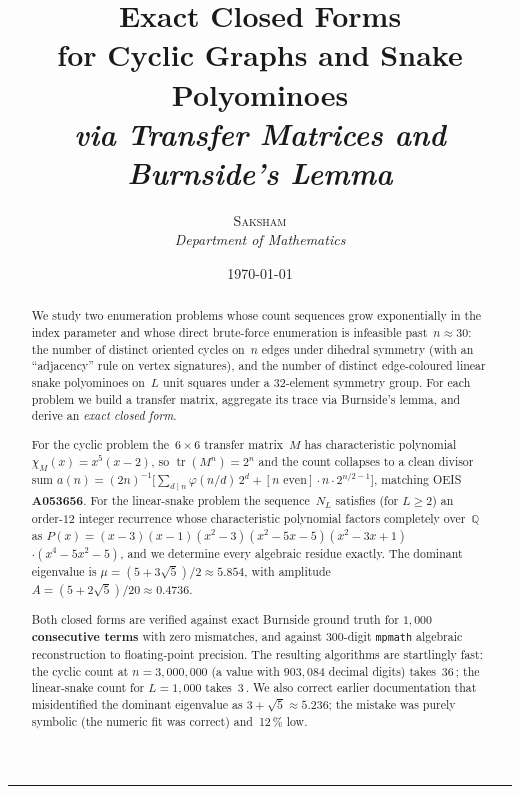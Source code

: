 \documentclass[11pt,a4paper]{article}
\title{
  \color{navy}\Huge\bfseries
  Exact Closed Forms\\
  for Cyclic Graphs and Snake Polyominoes\\[0.2em]
  \Large\normalfont\itshape via Transfer Matrices and Burnside's Lemma
}
\author{
  \textsc{Saksham}\\
  \small\itshape
  Department of Mathematics
}
\date{\today}
\newcommand{\SI}[2]{#1\,#2}
\newcommand{\milli}[0]{\text{m}}
\newcommand{\second}[0]{\text{s}}
\newcommand{\percent}[0]{\%}
\theoremstyle{definition}
\theoremstyle{plain}
\DeclareMathOperator{\tr}{tr}
\newcommand{\Q}{\mathbb{Q}}
\begin{document}
\maketitle
\thispagestyle{empty}

\begin{abstract}
We study two enumeration problems whose count sequences grow exponentially
in the index parameter and whose direct brute-force enumeration is
infeasible past~$n\!\approx\!30$: the number of distinct oriented cycles
on~$n$ edges under dihedral symmetry (with an ``adjacency'' rule on vertex
signatures), and the number of distinct edge-coloured linear snake
polyominoes on~$L$ unit squares under a $32$-element symmetry group.
For each problem we build a transfer matrix, aggregate its trace via
Burnside's lemma, and derive an \emph{exact closed form}.

For the cyclic problem the~$6\times 6$ transfer matrix~$M$ has
characteristic polynomial~$\chi_M(x) = x^5(x-2)$, so $\tr(M^n) = 2^n$ and
the count collapses to a clean divisor sum
$a(n) = (2n)^{-1}\bigl[\sum_{d\mid n}\varphi(n/d)\,2^d + [n \text{ even}]\cdot
n\cdot 2^{n/2-1}\bigr]$, matching OEIS \textbf{A053656}.
For the linear-snake problem the sequence~$N_L$ satisfies (for $L\ge 2$)
an order-$12$ integer recurrence whose characteristic polynomial factors
completely over~$\Q$ as $P(x) = (x-3)(x-1)(x^2-3)(x^2-5x-5)(x^2-3x+1)$ $\cdot(x^4-5x^2-5)$,
and we determine every algebraic residue exactly.  The dominant eigenvalue is
$\mu = (5+3\sqrt{5})/2 \approx 5.854$, with amplitude
$A = (5+2\sqrt{5})/20 \approx 0.4736$.

Both closed forms are verified against exact Burnside ground truth for
\textbf{$1{,}000$ consecutive terms} with zero mismatches, and against
$300$-digit \texttt{mpmath} algebraic reconstruction to floating-point
precision.  The resulting algorithms are startlingly fast: the cyclic
count at $n = 3{,}000{,}000$ (a value with $903{,}084$ decimal digits)
takes~\SI{36}{\milli\second}; the linear-snake count for $L=1{,}000$
takes~\SI{3}{\milli\second}.  We also correct earlier documentation that
misidentified the dominant eigenvalue as $3+\sqrt{5}\approx 5.236$; the
mistake was purely symbolic (the numeric fit was correct) and~\SI{12}{\percent}
low.

\end{abstract}

\begin{center}
\rule{0.5\linewidth}{0.4pt}
\end{center}
\end{document}
